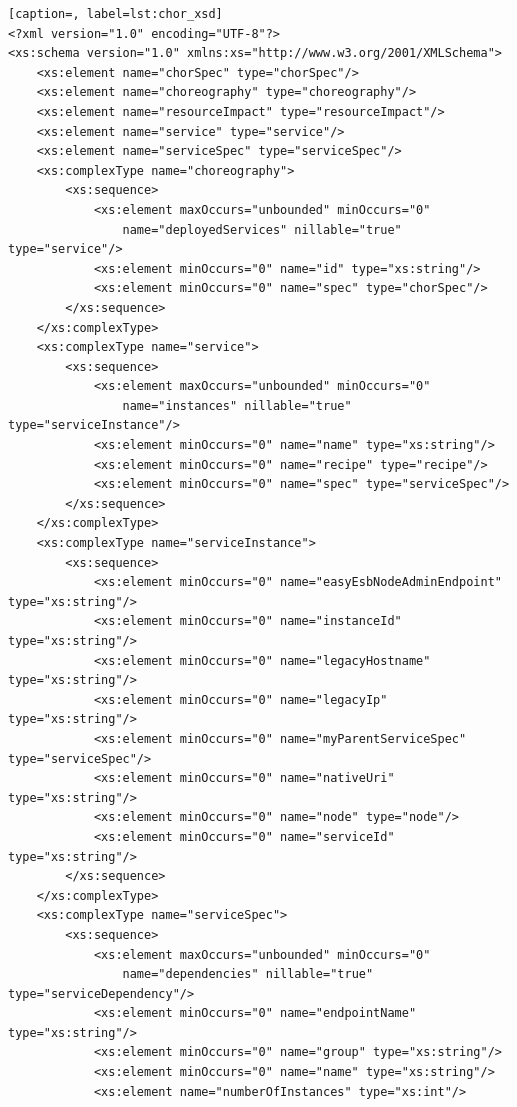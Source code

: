 \documentclass[a4paper, 10pt]{article}
\begin{document}
{\footnotesize

\lstset{language=XML}

\begin{lstlisting}[caption=, label=lst:chor_xsd]
<?xml version="1.0" encoding="UTF-8"?>
<xs:schema version="1.0" xmlns:xs="http://www.w3.org/2001/XMLSchema">
    <xs:element name="chorSpec" type="chorSpec"/>
    <xs:element name="choreography" type="choreography"/>
    <xs:element name="resourceImpact" type="resourceImpact"/>
    <xs:element name="service" type="service"/>
    <xs:element name="serviceSpec" type="serviceSpec"/>
    <xs:complexType name="choreography">
        <xs:sequence>
            <xs:element maxOccurs="unbounded" minOccurs="0"
                name="deployedServices" nillable="true" type="service"/>
            <xs:element minOccurs="0" name="id" type="xs:string"/>
            <xs:element minOccurs="0" name="spec" type="chorSpec"/>
        </xs:sequence>
    </xs:complexType>
    <xs:complexType name="service">
        <xs:sequence>
            <xs:element maxOccurs="unbounded" minOccurs="0"
                name="instances" nillable="true" type="serviceInstance"/>
            <xs:element minOccurs="0" name="name" type="xs:string"/>
            <xs:element minOccurs="0" name="recipe" type="recipe"/>
            <xs:element minOccurs="0" name="spec" type="serviceSpec"/>
        </xs:sequence>
    </xs:complexType>
    <xs:complexType name="serviceInstance">
        <xs:sequence>
            <xs:element minOccurs="0" name="easyEsbNodeAdminEndpoint" type="xs:string"/>
            <xs:element minOccurs="0" name="instanceId" type="xs:string"/>
            <xs:element minOccurs="0" name="legacyHostname" type="xs:string"/>
            <xs:element minOccurs="0" name="legacyIp" type="xs:string"/>
            <xs:element minOccurs="0" name="myParentServiceSpec" type="serviceSpec"/>
            <xs:element minOccurs="0" name="nativeUri" type="xs:string"/>
            <xs:element minOccurs="0" name="node" type="node"/>
            <xs:element minOccurs="0" name="serviceId" type="xs:string"/>
        </xs:sequence>
    </xs:complexType>
    <xs:complexType name="serviceSpec">
        <xs:sequence>
            <xs:element maxOccurs="unbounded" minOccurs="0"
                name="dependencies" nillable="true" type="serviceDependency"/>
            <xs:element minOccurs="0" name="endpointName" type="xs:string"/>
            <xs:element minOccurs="0" name="group" type="xs:string"/>
            <xs:element minOccurs="0" name="name" type="xs:string"/>
            <xs:element name="numberOfInstances" type="xs:int"/>

\end{lstlisting}}
\end{document}
